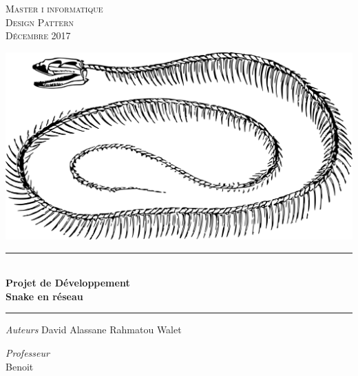 \documentclass{report}
\begin{document}
\begin{titlepage}
	\centering
	
    \vspace*{1.2 cm}
    
   	\textsc{\LARGE Master i informatique\\Design Pattern\\[0.3cm]\large Décembre 2017}

	\vspace{2.2cm}
    
    
    \includegraphics[scale = 0.29]{img/snake.png}\\[0.5 cm]
	\rule{\linewidth }{0.2 mm} \\[0.15 cm]
    {\LARGE \textbf{Projet de Développement}\\[0.2cm] \large
		\textbf{Snake en réseau}}\\
	\rule{\linewidth}{0.2 mm}
       \vspace*{0.1 cm}
	
	\begin{center}
	\vspace{0.3cm}
	
	\emph{Auteurs}\linebreak
	\vspace{0.1cm}
	David \linebreak
	Alassane \linebreak
	Rahmatou Walet 
		
	\vspace{0.5cm}
	\emph{Professeur}\\
	\vspace{0.1cm}
	Benoit 
	\end{center}		
	

\end{titlepage}
\end{document}
